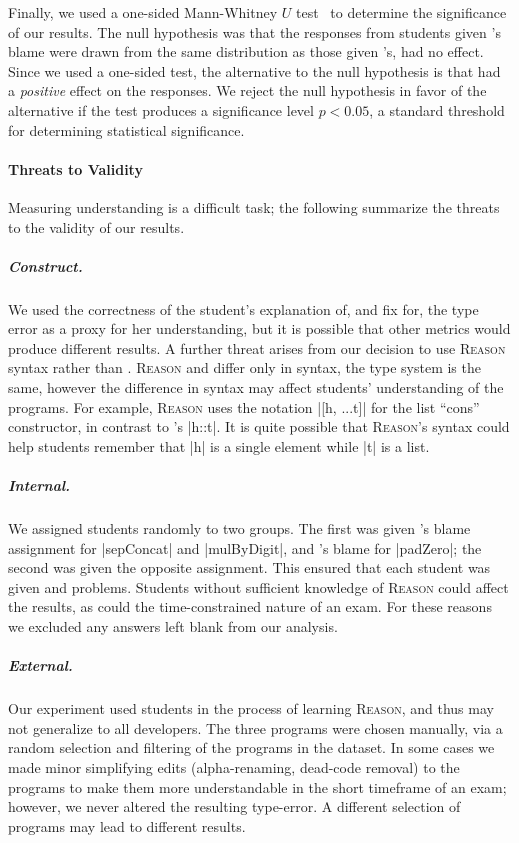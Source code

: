 Finally, we used a one-sided Mann-Whitney $U$ test~\cite{Mann1947-fd} to
determine the significance of our results.
%
The null hypothesis was that the responses from students given
\toolname's blame were drawn from the same distribution as those
given \sherrloc's, \ie \toolname had no effect.
%
Since we used a one-sided test, the alternative to the null hypothesis
is that \toolname had a \emph{positive} effect on the responses.
%
We reject the null hypothesis in favor of the alternative if the test
produces a significance level $p < 0.05$, a standard threshold for
determining statistical significance.

\paragraph{Threats to Validity}
Measuring understanding is a difficult task; the following summarize
the threats to the validity of our results.

\subparagraph{Construct.}
%
We used the correctness of the student's explanation of, and fix for,
the type error as a proxy for her understanding, but it is possible
that other metrics would produce different results.
%
A further threat arises from our decision to use \textsc{Reason} syntax
rather than \ocaml.
%
\textsc{Reason} and \ocaml differ only in syntax, the type system is the
same, however the difference in syntax may affect students'
understanding of the programs.
%
For example, \textsc{Reason} uses the notation |[h, ...t]| for the list
``cons'' constructor, in contrast to \ocaml's |h::t|.
%
It is quite possible that \textsc{Reason}'s syntax could help students
remember that |h| is a single element while |t| is a list.

\subparagraph{Internal.}
%
We assigned students randomly to two groups. The first was given
\sherrloc's blame assignment for |sepConcat| and |mulByDigit|, and
\toolname's blame for |padZero|; the second was given the opposite
assignment. This ensured that each student was given \sherrloc and
\toolname problems. Students without sufficient knowledge of
\textsc{Reason} could affect the results, as could the time-constrained
nature of an exam. For these reasons we excluded any answers left blank
from our analysis.

\subparagraph{External.}
%
Our experiment used students in the process of learning \textsc{Reason},
and thus may not generalize to all developers. The three
programs were chosen manually, via a random selection and
filtering of the programs in the \ucsdbench dataset. In some cases we made
minor simplifying edits (\eg alpha-renaming, dead-code removal) to the
programs to make them more understandable in the short timeframe of an
exam; however, we never altered the resulting type-error. A different
selection of programs may lead to different results.

